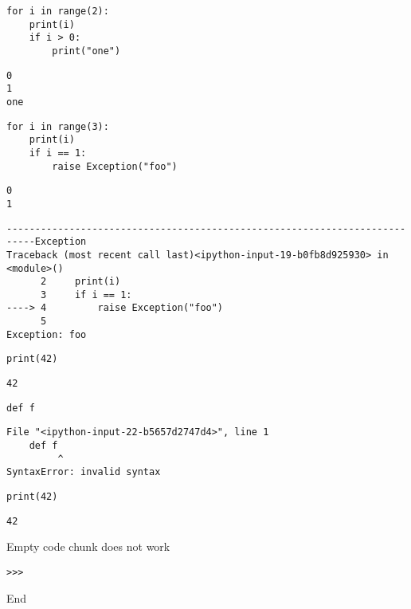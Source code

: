 \begin{verbatim}
for i in range(2):
    print(i)
    if i > 0:
        print("one")
\end{verbatim}
\begin{verbatim}
0
1
one
\end{verbatim}


\begin{verbatim}
for i in range(3):
    print(i)
    if i == 1:
        raise Exception("foo")
\end{verbatim}
\begin{verbatim}
0
1
\end{verbatim}
\begin{verbatim}
---------------------------------------------------------------------------Exception
Traceback (most recent call last)<ipython-input-19-b0fb8d925930> in
<module>()
      2     print(i)
      3     if i == 1:
----> 4         raise Exception("foo")
      5
Exception: foo
\end{verbatim}

\begin{verbatim}
print(42)
\end{verbatim}
\begin{verbatim}
42
\end{verbatim}


\begin{verbatim}
def f
\end{verbatim}
\begin{verbatim}
File "<ipython-input-22-b5657d2747d4>", line 1
    def f
         ^
SyntaxError: invalid syntax
\end{verbatim}

\begin{verbatim}
print(42)
\end{verbatim}
\begin{verbatim}
42
\end{verbatim}

%
%
Empty code chunk does not work

\begin{verbatim}
>>>

\end{verbatim}

End

